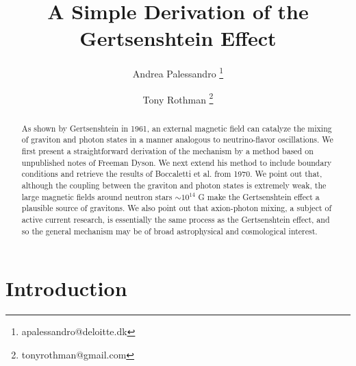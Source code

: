 \documentclass[12pt]{article}
\begin{document}

\title{A Simple Derivation of the Gertsenshtein Effect}

\author[1]{Andrea Palessandro \thanks{apalessandro@deloitte.dk}}
\author[2]{Tony Rothman \thanks{tonyrothman@gmail.com}}

\date{}

\maketitle

\begin{abstract}
\noindent As shown by Gertsenshtein in 1961, an external magnetic field can catalyze the mixing of graviton and photon states in a manner analogous to neutrino-flavor oscillations.  We first present a straightforward derivation of the mechanism by a method based on unpublished notes of Freeman Dyson.  We next extend his method to include boundary conditions and retrieve the results of Boccaletti et al. from 1970. We point out that, although the coupling between the graviton and photon states is extremely weak, the large magnetic fields around neutron stars $\sim 10^{14}$ G make the Gertsenshtein effect a plausible source of gravitons. We also point out that axion-photon mixing, a  subject of active current research, is essentially the same process as the Gertsenshtein effect, and so the general mechanism may be of broad astrophysical and cosmological interest.

\end{abstract}
\section{Introduction}
\setcounter{equation}{0}\label{sec1}
\baselineskip 8mm
\end{document}
